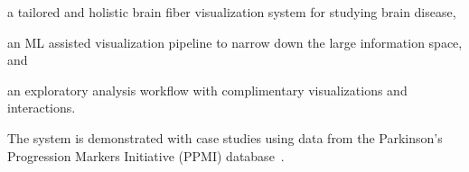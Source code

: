 \begin{compactitem}
	\item a tailored and holistic brain fiber visualization system for studying brain disease,
	\item an ML assisted visualization pipeline to narrow down the large information space, and
	\item an exploratory analysis workflow with complimentary visualizations and interactions.
\end{compactitem}

The system is demonstrated with 
case studies using data from 
the Parkinson's Progression Markers Initiative (PPMI) database~\cite{marek2011parkinson}.

%


